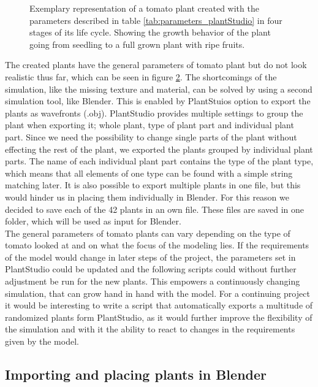 \begin{figure}[ht]
\begin{subfigure}{.24\textwidth}
		\label{fig:sub4}
	\end{subfigure}%
	\caption{Exemplary representation of a tomato plant created with the parameters described in table \ref{tab:parameters_plantStudio} in four stages of its life cycle. Showing the growth behavior of the plant going from seedling to a full grown plant with ripe fruits.}
	\label{fig:plantStudio}
	\vspace{-10pt}
\end{figure} 


The created plants have the general parameters of tomato plant but do not look realistic thus far, which can be seen in figure \ref{fig:plantStudio}. The shortcomings of the simulation, like the missing texture and material, can be solved by using a second simulation tool, like Blender. This is enabled by PlantStuios option to export the plants as wavefronts (.obj). PlantStudio provides multiple settings to group the plant when exporting it; whole plant, type of plant part and individual plant part. Since we need the possibility to change single parts of the plant without effecting the rest of the plant, we exported the plants grouped by individual plant parts. The name of each individual plant part contains the type of the plant type, which means that all elements of one type can be found with a simple string matching later. It is also possible to export multiple plants in one file, but this would hinder us in placing them individually in Blender. For this reason we decided to save each of the 42 plants in an own file. These files are saved in one folder, which will be used as input for Blender. \\

The general parameters of tomato plants can vary depending on the type of tomato looked at and on what the focus of the modeling lies. If the requirements of the model would change in later steps of the project, the parameters set in PlantStudio could be updated and the following scripts could without further adjustment be run for the new plants. This empowers a continuously changing simulation, that can grow hand in hand with the model. For a continuing project it would be interesting to write a script that automatically exports a multitude of randomized plants form PlantStudio, as it would further improve the flexibility of the simulation and with it the ability to react to changes in the requirements given by the model.


\subsection{Importing and placing plants in Blender}



